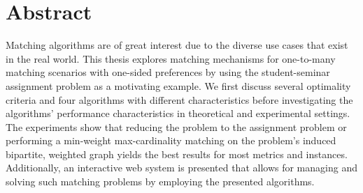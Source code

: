 \section*{Abstract}\label{sec:abstract}

Matching algorithms are of great interest due to the diverse use cases that exist in the real world. This thesis explores matching mechanisms for one-to-many matching scenarios with one-sided preferences by using the student-seminar assignment problem as a motivating example. We first discuss several optimality criteria and four algorithms with different characteristics before investigating the algorithms' performance characteristics in theoretical and experimental settings. The experiments show that reducing the problem to the assignment problem or performing a min-weight max-cardinality matching on the problem's induced bipartite, weighted graph yields the best results for most metrics and instances. Additionally, an interactive web system is presented that allows for managing and solving such matching problems by employing the presented algorithms. 